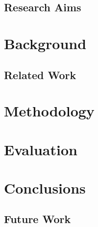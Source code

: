 \documentclass{mpaper}
\begin{document}
\subsection{Research Aims}



\section{Background}

\subsection{Related Work}



\section{Methodology}



\section{Evaluation}



\section{Conclusions}



\subsection{Future Work}






\end{document}
